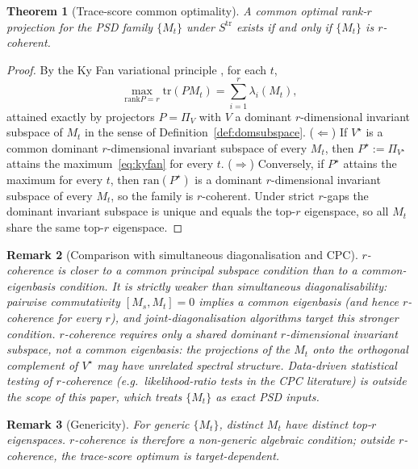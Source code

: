 \documentclass[final,3p,times]{elsarticle}
\newtheorem{theorem}{Theorem}
\newtheorem{remark}[theorem]{Remark}
\newcommand{\tr}{\mathrm{tr}}
\newcommand{\rank}{\mathrm{rank}}
\newcommand{\ran}{\mathrm{ran}}
\begin{document}
\begin{theorem}[Trace-score common optimality]\label{thm:pred}
A common optimal rank-$r$ projection for the PSD family $\{M_t\}$ under
$S^{\mathrm{tr}}$ exists if and only if $\{M_t\}$ is $r$-coherent.
\end{theorem}

\begin{proof}
By the Ky Fan variational principle \cite{Fan1949,HornJohnson2013}, for
each $t$,
\begin{equation}\label{eq:kyfan}
\max_{\rank P = r} \tr(P M_t) = \sum_{i=1}^r \lambda_i(M_t),
\end{equation}
attained exactly by projectors $P=\Pi_V$ with $V$ a dominant
$r$-dimensional invariant subspace of $M_t$ in the sense of
Definition~\ref{def:domsubspace}.
($\Leftarrow$) If $V^\star$ is a common dominant $r$-dimensional invariant
subspace of every $M_t$, then $P^\star:=\Pi_{V^\star}$ attains the
maximum~\eqref{eq:kyfan} for every $t$.
($\Rightarrow$) Conversely, if $P^\star$ attains the maximum for every
$t$, then $\ran(P^\star)$ is a dominant $r$-dimensional invariant
subspace of every $M_t$, so the family is $r$-coherent.
Under strict $r$-gaps the dominant invariant subspace is unique and equals
the top-$r$ eigenspace, so all $M_t$ share the same top-$r$ eigenspace.
\end{proof}

\begin{remark}[Comparison with simultaneous diagonalisation and CPC]
$r$-coherence is closer to a \emph{common principal subspace} condition
\cite{Flury1984,Krzanowski1979} than to a common-eigenbasis condition.
It is strictly weaker than simultaneous diagonalisability: pairwise
commutativity $[M_s,M_t]=0$ implies a common eigenbasis (and hence
$r$-coherence for every $r$), and joint-diagonalisation algorithms
\cite{Pham2001} target this stronger condition.
$r$-coherence requires only a shared dominant $r$-dimensional invariant
subspace, not a common eigenbasis: the projections of the $M_t$ onto
the orthogonal complement of $V^\star$ may have unrelated spectral
structure.
Data-driven statistical testing of $r$-coherence (e.g.\ likelihood-ratio
tests in the CPC literature) is outside the scope of this paper, which
treats $\{M_t\}$ as exact PSD inputs.
\end{remark}

\begin{remark}[Genericity]
For generic $\{M_t\}$, distinct $M_t$ have distinct top-$r$ eigenspaces.
$r$-coherence is therefore a non-generic algebraic condition; outside
$r$-coherence, the trace-score optimum is target-dependent.
\end{remark}
\end{document}
